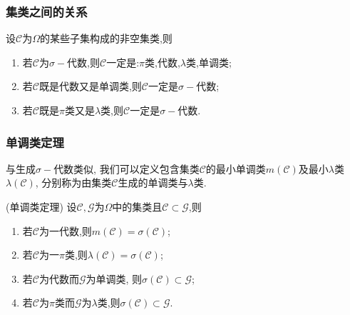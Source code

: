 \documentclass[Prob-All.tex]{subfiles}
\begin{document}
  \begin{frame}
	\frametitle{集类之间的关系}
	\begin{thm}
	  设$\mathcal{C}$为$\Omega$的某些子集构成的非空集类,则
	  \begin{enumerate}
	  \item 若$\mathcal{C}$为$\sigma-$代数,则$\mathcal{C}$一定是:$\pi$类,代数,$\lambda$类,单调类;
	  \item 若$\mathcal{C}$既是代数又是单调类,则$\mathcal{C}$一定是$\sigma-$代数;
	  \item 若$\mathcal{C}$既是$\pi$类又是$\lambda$类,则$\mathcal{C}$一定是$\sigma-$代数.
	  \end{enumerate}

	\end{thm}

  \end{frame}
  \begin{frame}
	\frametitle{单调类定理}
	\begin{defi}
	  与生成$\sigma-$代数类似, 我们可以定义包含集类$\mathcal{C}$的最小单调类$m(\mathcal{C})$及最小$\lambda$类$\lambda(\mathcal{C})$, 分别称为由集类$\mathcal{C}$生成的单调类与$\lambda$类.
	\end{defi}
  \vspace{0.2cm}
  \pause
	\begin{thm}(单调类定理) 设$\mathcal{C},\mathcal{G}$为$\Omega$中的集类且$\mathcal{C}\subset \mathcal{G}$,则
	  \begin{enumerate}
	  \item 若$\mathcal{C}$为一代数,则$m(\mathcal{C})=\sigma(\mathcal{C})$;
	  \item 若$\mathcal{C}$为一$\pi$类,则$\lambda(\mathcal{C})=\sigma(\mathcal{\mathcal{C}})$;
	  \item 若$\mathcal{C}$为代数而$\mathcal{G}$为单调类, 则$\sigma(\mathcal{C})\subset \mathcal{G}$;
	  \item 若$\mathcal{C}$为$\pi$类而$\mathcal{G}$为$\lambda$类,则$\sigma(\mathcal{C})\subset \mathcal{G}$.
	  \end{enumerate}
	\end{thm}
  \end{frame}
\end{document}
